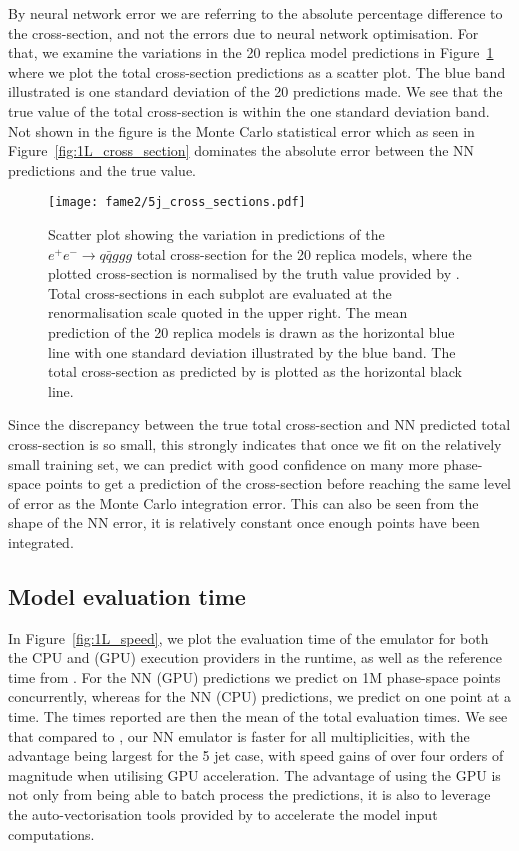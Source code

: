 \documentclass[main.tex]{subfiles}
\begin{document}
By neural network error we are referring to the absolute percentage
difference to the cross-section, and not the errors due to neural
network optimisation. For that, we examine the variations in the 20
replica model predictions in Figure~\ref{fig:1L_5j_cs} where we plot the
total cross-section predictions as a scatter plot. The blue band
illustrated is one standard deviation of the 20 predictions made.
We see that the true value of the total cross-section is within
the one standard deviation band. Not shown in the figure is the
Monte Carlo statistical error which as seen in Figure~\ref{fig:1L_cross_section}
dominates the absolute error between the NN predictions and
the true value.

\begin{figure}
    \texttt{[image: fame2/5j\_cross\_sections.pdf]}
    \caption{Scatter plot showing the variation in predictions of
    the $e^{+}e^{-} \rightarrow q\bar{q}ggg$ total cross-section for the 20 replica models, where
    the plotted cross-section is normalised by the truth value
    provided by {\MadGraph}.
    Total cross-sections in each subplot are evaluated at the
    renormalisation scale quoted in the upper right.
    The mean prediction of the 20 replica models is drawn as the horizontal
    blue line with one standard deviation illustrated by the blue band.
    The total cross-section as predicted by {\MadGraph} is plotted
    as the horizontal black line.}
    \label{fig:1L_5j_cs}
\end{figure}

Since the discrepancy between the true total
cross-section and NN predicted total cross-section is so small,
this strongly indicates that once we fit on the relatively small
training set, we can predict with good confidence on many more
phase-space points to get a prediction of the cross-section before
reaching the same level of error as the Monte Carlo integration error.
This can also be seen from the shape of the NN error, it is relatively
constant once enough points have been integrated.

\subsection{Model evaluation time}
In Figure~\ref{fig:1L_speed}, we plot the evaluation time of the emulator
for both the CPU and {\CUDA} (GPU) execution providers in the {\ONNX} runtime,
as well as the reference time from {\MadGraph}. For the NN (GPU)
predictions we predict on 1M phase-space points concurrently, whereas
for the NN (CPU) predictions, we predict on one point at a time.
The times reported are then the mean of the total evaluation times.
We see that compared to {\MadGraph}, our NN emulator
is faster for all multiplicities, with the advantage being largest
for the 5 jet case, with speed gains of over four orders of magnitude
when utilising GPU acceleration. The advantage of using the GPU is
not only from being able to batch process the predictions, it is
also to leverage the auto-vectorisation tools provided
by {\TensorFlow} to accelerate the model input computations.
\end{document}
